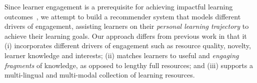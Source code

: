 \documentclass[letterpaper]{article} %
\begin{document}

 Since learner engagement is a prerequisite for achieving impactful learning outcomes~\cite{lan2017behavior}, we attempt to build a recommender system that models different drivers of engagement,
assisting learners on their \emph{personal learning trajectory} to achieve their learning goals. Our approach differs from previous work in that it (i) incorporates different drivers of engagement such as resource quality, novelty, learner knowledge and interests; (ii) matches learners to useful and \emph{engaging fragments} of knowledge, as opposed to lengthy full resources; and (iii) supports a multi-lingual and multi-modal collection of learning resources.
\end{document}
